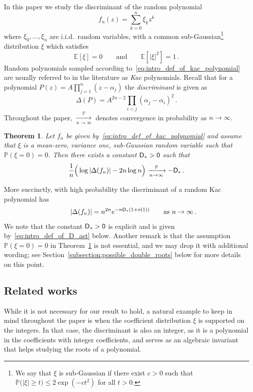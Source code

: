 \documentclass[11pt]{amsart}
\newtheorem{theorem}{Theorem}
\theoremstyle{remark}
\theoremstyle{definition}
\newcommand{\bP}{\mathbb P}
\newcommand{\bE}{\mathbb E}
\newcommand{\disc}{\Delta}
\begin{document}
    In this paper we study the discriminant of the random polynomial 
	\begin{equation}
		\label{eq:intro_def_of_kac_polynomial}
		f_n(z) = \sum_{k=0}^n \xi_k z^k 
	\end{equation}
	where $\xi_0,\ldots,\xi_n$ are i.i.d.\ random variables, with a common sub-Gaussian\footnote{We say that $\xi$ is sub-Gaussian if there exist $c>0$ such that 
	$
	\bP\big(|\xi|\ge t\big) \le 2\exp(-ct^2)
	$
	for all $t>0$. } 
    distribution $\xi$ which satisfies $$\bE[\xi] = 0 \qquad \text{and} \qquad \bE[|\xi|^2] = 1 \, .$$  
    Random polynomials sampled according to~\eqref{eq:intro_def_of_kac_polynomial} are usually referred to in the literature as \emph{Kac} polynomials. Recall that for a polynomial $P(z) = A\prod_{j=1}^n(z-\alpha_j)$ the \emph{discriminant} is given as
    \begin{equation}
        \label{eq:intro_def_of_disc}
        \disc(P) = A^{2n-2} \prod_{i<j} (\alpha_j-\alpha_i)^2 \, .
    \end{equation}
   Throughout the paper, $\xrightarrow[n\to \infty]{\bP}$ denotes convergence in probability as $n\to \infty$.
	\begin{theorem}
		\label{thm:LLN_for_L_n}
		Let $f_n$ be given by~\eqref{eq:intro_def_of_kac_polynomial} and assume that $\xi$ is a mean-zero, variance one, sub-Gaussian random variable such that $\bP(\xi=0)=0$. 
        Then there exists a constant $\sf{D}_\ast > 0$ such that
		\begin{equation*}
			\frac{1}{n}\Big(\log|\disc(f_n)| - 2n\log n\Big) \xrightarrow[n\to \infty]{\bP} -{\sf{D}_\ast}  \, . 
		\end{equation*}
	\end{theorem}  
    \noindent
    More succinctly, with high probability the discriminant of a random Kac polynomial has
    \begin{equation}
        \label{eq:intro_asymptotic_for_disc_whp}
       \qquad |\disc(f_n)| = n^{2n} e^{-n{\sf D}_{\ast}(1+ o(1))} \qquad \text{as } n\to \infty\, . 
    \end{equation} 
	We note that the constant $\sf{D}_\ast>0$ is explicit and is given by~\eqref{eq:intro_def_of_D_ast} below. Another remark is that the assumption $\bP(\xi=0)=0$ in Theorem~\ref{thm:LLN_for_L_n} is not essential, and we may drop it with additional wording; see Section~\ref{subsection:possible_double_roots} below for more details on this point.

        \subsection{Related works}
        While it is not necessary for our result to hold, a natural example to keep in mind throughout the paper is when the coefficient distribution $\xi$ is supported on the integers. In that case, the discriminant is also an integer, as it is a polynomial in the coefficients with integer coefficients, and serves as an algebraic invariant that helps studying the roots of a polynomial. 
\end{document}
